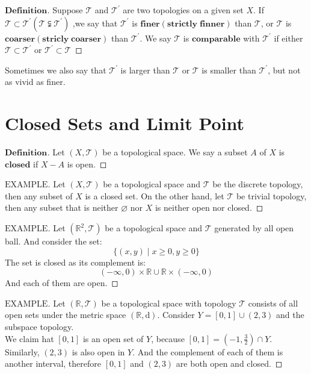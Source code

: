 \documentclass[a4paper, 11pt]{article}
\theoremstyle{remark}
\newenvironment{mydef}
{\renewcommand\qedsymbol{$ $}\begin{proof}[$\mathbf{Definition}$]}
  {\end{proof}}
\newenvironment{myexam}
{\renewcommand\qedsymbol{$ $}\begin{proof}[$\mathrm{EXAMPLE}$]}
  {\end{proof}}
\theoremstyle{definition}
\begin{document}
\vspace{0.5cm}
\begin{mydef}
        Suppose $\mathcal{T}$ and $\mathcal{T}^{'}$ are two topologies on a given set
        $X$. If $\mathcal{T}\subset\mathcal{T}^{'}(\mathcal{T}\subsetneqq\mathcal{T}^{'})$
        ,we say that $\mathcal{T}^{'}$ is  
        $\bm{finer}(\bm{strictly\;finner})$ than $\mathcal{T}$, or $\mathcal{T}$ is 
        $\bm{coarser}(\bm{stricly\;coarser})$ than $\mathcal{T}^{'}$. We say
        $\mathcal{T}$ is $\bm{comparable}$ with $\mathcal{T}^{'}$ if either
        $\mathcal{T}\subset \mathcal{T}^{'}$ or $\mathcal{T}^{'}\subset \mathcal{T}$
\end{mydef}
Sometimes we also say that $\mathcal{T}^{'}$ is larger than $\mathcal{T}$ or $\mathcal{T}$
is smaller than $\mathcal{T}^{'}$, but not as vivid as finer.

\section{Closed Sets and Limit Point}
\begin{mydef}
        Let $(X,\mathcal{T})$ be a topological space. We say a subset $A$ of $X$ is 
        $\bm{closed}$ if $X-A$ is open.
\end{mydef}

\begin{myexam}
        Let $(X,\mathcal{T})$ be a topological space and $\mathcal{T}$ be the discrete 
        topology, then any subset of $X$ is a closed set. On the other hand, let
        $\mathcal{T}$ be trivial topology, then any subset that is neither $\varnothing$
        nor $X$ is neither open nor closed.
\end{myexam}

\begin{myexam}
        Let $(\mathbb{R}^{2},\mathcal{T})$ be a topological space and $\mathcal{T}$ 
        generated by all open ball. And consider the set:
        $$
        \{(x,y)\mid x\ge 0,y\ge 0\}
        $$The set is closed as its complement is:
        $$
        (-\infty,0)\times \mathbb{R}\cup \mathbb{R}\times(-\infty,0)
        $$ And each of them are open.
\end{myexam}

\begin{myexam}
        Let $(\mathbb{R}, \mathcal{T})$ be a topological space with topology $\mathcal{T}$
        consists of all open sets under the metric space $(\mathbb{R}, \mathrm{d})$.
        Consider $Y=[0,1]\cup(2,3)$ and the subspace topology.\\
        We claim hat $[0,1]$ is an open set of $Y$, because $[0,1]=(-1,\frac{3}{2})\cap
        Y$. Similarly, $(2,3)$ is also open in $Y$. And the complement of each of them is
        another interval, therefore $[0,1]$ and $(2,3)$ are both open and closed.
\end{myexam}
\end{document}
